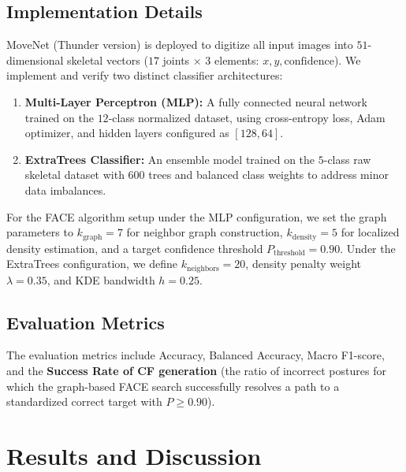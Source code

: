 \documentclass[pdflatex,sn-mathphys-num]{sn-jnl}%
\theoremstyle{thmstyleone}%
\theoremstyle{thmstyletwo}%
\theoremstyle{thmstylethree}%
\begin{document}
\subsection{Implementation Details}
MoveNet (Thunder version) is deployed to digitize all input images into $51$-dimensional skeletal vectors ($17$ joints $\times$ $3$ elements: $x, y, \text{confidence}$). We implement and verify two distinct classifier architectures:
\begin{enumerate}
    \item \textbf{Multi-Layer Perceptron (MLP):} A fully connected neural network trained on the $12$-class normalized dataset, using cross-entropy loss, Adam optimizer, and hidden layers configured as $[128, 64]$.
    \item \textbf{ExtraTrees Classifier:} An ensemble model trained on the $5$-class raw skeletal dataset with $600$ trees and balanced class weights to address minor data imbalances.
\end{enumerate}
For the FACE algorithm setup under the MLP configuration, we set the graph parameters to $k_{\text{graph}} = 7$ for neighbor graph construction, $k_{\text{density}} = 5$ for localized density estimation, and a target confidence threshold $P_{\text{threshold}} = 0.90$. Under the ExtraTrees configuration, we define $k_{\text{neighbors}} = 20$, density penalty weight $\lambda = 0.35$, and KDE bandwidth $h = 0.25$.

\subsection{Evaluation Metrics}
The evaluation metrics include Accuracy, Balanced Accuracy, Macro F1-score, and the \textbf{Success Rate of CF generation} (the ratio of incorrect postures for which the graph-based FACE search successfully resolves a path to a standardized correct target with $P \geq 0.90$).

\section{Results and Discussion}\label{sec:results}
\end{document}
